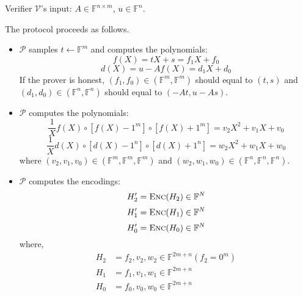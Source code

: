 Verifier $\mathcal{V}$'s input: $A \in \mathbb{F}^{n \times m}$, $u \in \mathbb{F}^{n}$.

The protocol proceeds as follows.



\begin{itemize}
    \item $\mathcal{P}$ samples $t \leftarrow \mathbb{F}^{m}$ and computes the polynomials:
\begin{equation}
\label{eq:lwe3}
    f(X) = tX+s = f_1 X + f_0
\end{equation}
\begin{equation}
\label{eq:lwe4}
    d(X)=u-Af(X) = d_1 X + d_0
\end{equation}
If the prover is honest, $(f_1, f_0) \in (\mathbb{F}^m, \mathbb{F}^m)$ should equal to $(t, s)$ and $(d_1, d_0) \in (\mathbb{F}^n, \mathbb{F}^n)$ should equal to $(-At, u-As)$.

    \item $\mathcal{P}$ computes the polynomials:
\begin{equation}
\label{eq:lwe1}
    \frac{1}{X} f(X) \circ [f(X) - 1^m] \circ [f(X) + 1^m] = v_2X^2 + v_1X + v_0
\end{equation}
\begin{equation}
\label{eq:lwe2}
    \frac{1}{X} d(X) \circ [d(X) - 1^n] \circ [d(X) + 1^n] = w_2X^2 + w_1X + w_0
\end{equation}
where $(v_2, v_1, v_0) \in (\mathbb{F}^m, \mathbb{F}^m, \mathbb{F}^m)$ and $(w_2, w_1, w_0) \in (\mathbb{F}^n, \mathbb{F}^n, \mathbb{F}^n)$.

    \item $\mathcal{P}$ computes the encodings:
\begin{equation*}
    H_2^\prime = \textsc{Enc}(H_2) \in \mathbb{F}^{N}
\end{equation*}
\begin{equation*}
    H_1^\prime = \textsc{Enc}(H_1) \in \mathbb{F}^{N}
\end{equation*}
\begin{equation*}
    H_0^\prime = \textsc{Enc}(H_0) \in \mathbb{F}^{N}
\end{equation*}
where, 
\begin{align*}
    H_2 &= f_2, v_2, w_2 \in \mathbb{F}^{2m+n} (f_2 = 0^m) \\
    H_1 &= f_1, v_1, w_1 \in \mathbb{F}^{2m+n} \\
    H_0 &= f_0, v_0, w_0 \in \mathbb{F}^{2m+n}
\end{align*}


\end{itemize}
